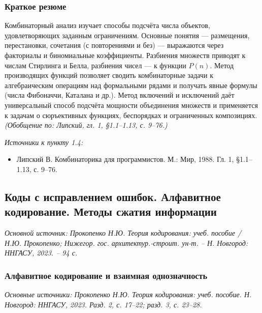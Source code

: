 \documentclass[a4paper,12pt]{article}
\begin{document}
\subsubsection{Краткое резюме}

Комбинаторный анализ изучает способы подсчёта числа объектов, удовлетворяющих заданным ограничениям. Основные понятия — размещения, перестановки, сочетания (с повторениями и без) — выражаются через факториалы и биномиальные коэффициенты. Разбиения множеств приводят к числам Стирлинга и Белла, разбиения чисел — к функции \(P(n)\). Метод производящих функций позволяет сводить комбинаторные задачи к алгебраическим операциям над формальными рядами и получать явные формулы (числа Фибоначчи, Каталана и др.). Метод включений и исключений даёт универсальный способ подсчёта мощности объединения множеств и применяется к задачам о сюръективных функциях, беспорядках и ограниченных композициях.
\textit{(Обобщение по: Липский, гл. 1, §1.1--1.13, с. 9--76.)}

\noindent\textit{Источники к пункту 1.4:}
\begin{itemize}
\item Липский В. Комбинаторика для программистов. М.: Мир, 1988. Гл. 1, §1.1--1.13, с. 9--76.
\end{itemize}

\subsection{Коды с исправлением ошибок. Алфавитное кодирование. Методы сжатия информации}

\noindent\textit{Основной источник: Прокопенко Н.Ю. Теория кодирования: учеб. пособие / Н.Ю. Прокопенко; Нижегор. гос. архитектур.-строит. ун-т. – Н. Новгород: ННГАСУ, 2023. – 94 с.}

\subsubsection{Алфавитное кодирование и взаимная однозначность}

\noindent\textit{Основные источники: Прокопенко Н.Ю. Теория кодирования: учеб. пособие. Н. Новгород: ННГАСУ, 2023. Разд. 2, с. 17--22; разд. 3, с. 23--28.}
\end{document}
